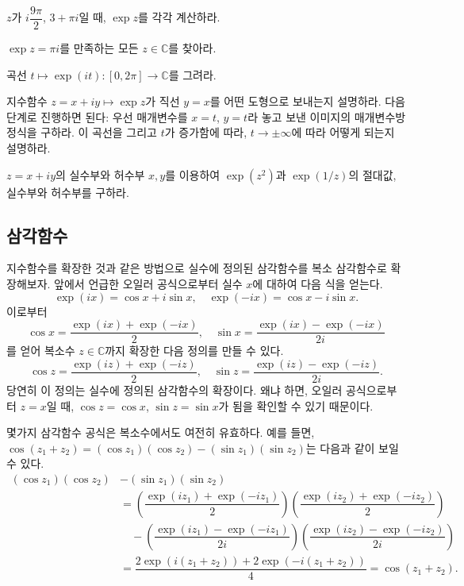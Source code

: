 \begin{salt_exercise} \label{ex-1-31}
$z$가 $i\dfrac{9\pi}2$, $3+\pi i$일 때,
$\exp z$를 각각 계산하라.
\end{salt_exercise}

\begin{salt_exercise} \label{ex-1-32}
$\exp z = \pi i$를 만족하는 모든 $z\in\mathbb C$를 찾아라.
\end{salt_exercise}

\begin{salt_exercise} \label{ex-1-33}
곡선 $t\mapsto \exp(it):[0,2\pi] \to \mathbb C$를 그려라.
\end{salt_exercise}

\begin{salt_exercise} \label{ex-1-34}
지수함수 $z=x+iy \mapsto \exp z$가 직선 $y=x$를 어떤 도형으로 보내는지 설명하라.
다음 단계로 진행하면 된다:
우선 매개변수를 $x=t$, $y=t$라 놓고
보낸 이미지의 매개변수방정식을 구하라.
이 곡선을 그리고 $t$가 증가함에 따라, $t\to\pm\infty$에 따라 어떻게 되는지 설명하라.
\end{salt_exercise}

\begin{salt_exercise} \label{ex-1-35}
$z=x+iy$의 실수부와 허수부 $x,y$를 이용하여
$\exp(z^2)$과 $\exp(1/z)$의 절대값, 실수부와 허수부를 구하라.
\end{salt_exercise}


\subsection{삼각함수}\label{sec-1-4-2}

지수함수를 확장한 것과 같은 방법으로
실수에 정의된 삼각함수를 복소 삼각함수로 확장해보자.
앞에서 언급한 오일러 공식으로부터 실수 $x$에 대하여 다음 식을 얻는다.
$$
\exp(ix) = \cos x + i \sin x, \quad
\exp(-ix) = \cos x - i \sin x.
$$
이로부터 
$$
\cos x = \dfrac{\exp(ix) + \exp(-ix)}2, \quad
\sin x = \dfrac{\exp(ix) - \exp(-ix)}{2i}
$$
를 얻어 복소수 $z\in\mathbb C$까지 확장한 다음 정의를 만들 수 있다.
$$
\cos z = \dfrac{\exp(iz) + \exp(-iz)}2, \quad
\sin z = \dfrac{\exp(iz) - \exp(-iz)}{2i}.
$$
당연히 이 정의는 실수에 정의된 삼각함수의 확장이다.
왜냐 하면, 오일러 공식으로부터 
$z=x$일 때, $\cos z = \cos x$, $\sin z = \sin x$가 됨을 확인할 수 있기 때문이다.

몇가지 삼각함수 공식은 복소수에서도 여전히 유효하다.
예를 들면, $\cos(z_1+z_2) = (\cos z_1)(\cos z_2) - (\sin z_1)(\sin z_2)$는 
다음과 같이 보일 수 있다.
\begin{align*}
(\cos z_1)(\cos z_2) &- (\sin z_1)(\sin z_2)  \\
&= \left( \dfrac{\exp(iz_1)+\exp(-iz_1)}2\right)
\left( \dfrac{\exp(iz_2)+\exp(-iz_2)}2\right) \\
& \quad - \left( \dfrac{\exp(iz_1)-\exp(-iz_1)}{2i}\right)
\left( \dfrac{\exp(iz_2)-\exp(-iz_2)}{2i}\right) \\
&= \dfrac{2\exp(i(z_1+z_2)) + 2\exp(-i(z_1+z_2))}{4} 
= \cos(z_1+z_2).
\end{align*}

